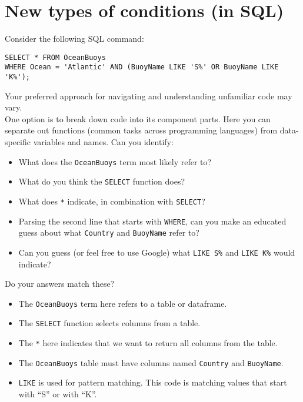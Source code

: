 \documentclass[
]{book}
\providecommand{\tightlist}{%
  \setlength{\itemsep}{0pt}\setlength{\parskip}{0pt}}
\begin{document}
\section{New types of conditions (in SQL)}\label{new-types-of-conditions-in-sql}

Consider the following SQL command:

\begin{verbatim}
SELECT * FROM OceanBuoys
WHERE Ocean = 'Atlantic' AND (BuoyName LIKE 'S%' OR BuoyName LIKE 'K%');
\end{verbatim}

Your preferred approach for navigating and understanding unfamiliar code may vary.\\

One option is to break down code into its component parts. Here you can separate out functions (common tasks across programming languages) from data-specific variables and names. Can you identify:

\begin{itemize}
\tightlist
\item
  What does the \texttt{OceanBuoys} term most likely refer to?
\item
  What do you think the \texttt{SELECT} function does?
\item
  What does \texttt{*} indicate, in combination with \texttt{SELECT}?
\item
  Parsing the second line that starts with \texttt{WHERE}, can you make an educated guess about what \texttt{Country} and \texttt{BuoyName} refer to?
\item
  Can you guess (or feel free to use Google) what \texttt{LIKE\ \textquotesingle{}S\%\textquotesingle{}} and \texttt{LIKE\ \textquotesingle{}K\%\textquotesingle{}} would indicate?
\end{itemize}

Do your answers match these?

\begin{itemize}
\tightlist
\item
  The \texttt{OceanBuoys} term here refers to a table or dataframe.
\item
  The \texttt{SELECT} function selects columns from a table.
\item
  The \texttt{*} here indicates that we want to return all columns from the table.
\item
  The \texttt{OceanBuoys} table must have columns named \texttt{Country} and \texttt{BuoyName}.
\item
  \texttt{LIKE} is used for pattern matching. This code is matching values that start with ``S'' or with ``K''.
\end{itemize}
\end{document}
